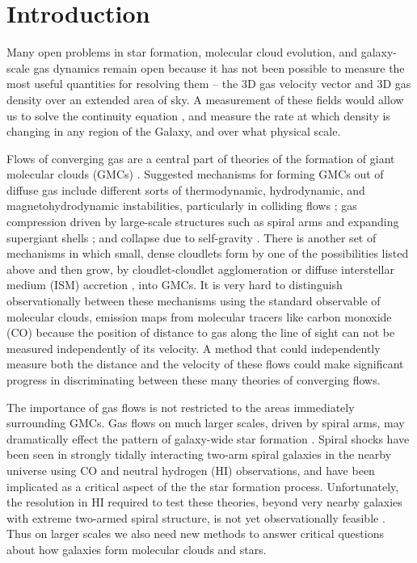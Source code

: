 \section{Introduction}
Many open problems in star formation, molecular cloud evolution, and galaxy-scale gas dynamics remain open because it has not been possible to measure the most useful quantities for resolving them -- the 3D gas velocity vector and 3D gas density over an extended area of sky. A measurement of these fields would allow us to solve the continuity equation \cite{euler1757principes}, and measure the rate at which density is changing in any region of the Galaxy, and over what physical scale. 

Flows of converging gas are a central part of theories of the formation of giant molecular clouds (GMCs) \cite{Vazquez_Semadeni_2007, Audit_2005}. Suggested mechanisms for forming GMCs out of diffuse gas include different sorts of thermodynamic, hydrodynamic, and magnetohydrodynamic instabilities, particularly in colliding flows \citep{Clark:2012bq,2014ApJ...790...37C, Heitsch06}; gas compression driven by large-scale structures such as spiral arms and expanding supergiant shells \citep{Roberts:1972bp,Bonnell:2006hn,Fujimoto:2014kh}; and collapse due to self-gravity \citep{Kim:2002da,2012MNRAS.425.2157D,VazquezSemadeni:2007cj}.
There is another set of mechanisms in which small, dense cloudlets form by one of the possibilities listed above and then grow, by cloudlet-cloudlet agglomeration \citep{Roberts:1987eb,Dobbs:2008ez,Tasker:2009gc} or diffuse interstellar medium (ISM) accretion \citep{Goldbaum:2011kj,Heitsch:2013jp}, into GMCs. It is very hard to distinguish observationally between these mechanisms using the standard observable of molecular clouds, emission maps from molecular tracers like carbon monoxide (CO) because the position of distance to gas along the line of sight can not be measured independently of its velocity. A method that could independently measure both the distance and the velocity of these flows could make significant progress in discriminating between these many theories of converging flows.

The importance of gas flows is not restricted to the areas immediately surrounding GMCs. Gas flows on much larger scales, driven by spiral arms, may dramatically effect the pattern of galaxy-wide star formation \cite{Roberts_1972, Bonnell_2006}. Spiral shocks have been seen in strongly tidally interacting two-arm spiral galaxies in the nearby universe \cite{Visser:1980vc, Visser:1980ud, Shetty_2007} using CO and neutral hydrogen (HI) observations, and have been implicated as a critical aspect of the the star formation process. Unfortunately, the resolution in HI required to test these theories, beyond very nearby galaxies with extreme two-armed spiral structure, is not yet observationally feasible \cite{Visser:1980ud}. Thus on larger scales we also need new methods to answer critical questions about how galaxies form molecular clouds and stars. 

